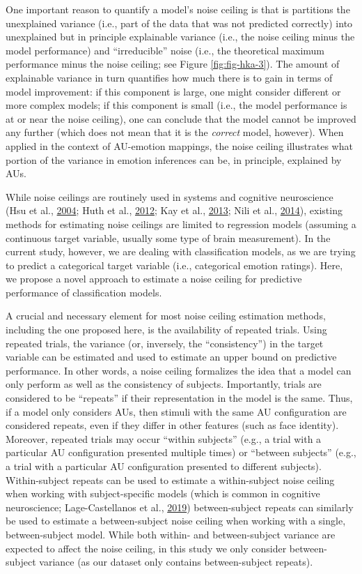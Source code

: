 \documentclass[11pt,american,a4paper,oneside,]{memoir} %
\begin{document}
One important reason to quantify a model's noise ceiling is that is partitions the unexplained variance (i.e., part of the data that was not predicted correctly) into unexplained but in principle explainable variance (i.e., the noise ceiling minus the model performance) and ``irreducible'' noise (i.e., the theoretical maximum performance minus the noise ceiling; see Figure \ref{fig:fig-hka-3}). The amount of explainable variance in turn quantifies how much there is to gain in terms of model improvement: if this component is large, one might consider different or more complex models; if this component is small (i.e., the model performance is at or near the noise ceiling), one can conclude that the model cannot be improved any further (which does not mean that it is the \emph{correct} model, however). When applied in the context of AU-emotion mappings, the noise ceiling illustrates what portion of the variance in emotion inferences can be, in principle, explained by AUs.

While noise ceilings are routinely used in systems and cognitive neuroscience (Hsu et al., \protect\hyperlink{ref-Hsu2004-hs}{2004}; Huth et al., \protect\hyperlink{ref-Huth2012-yc}{2012}; Kay et al., \protect\hyperlink{ref-Kay2013-ch}{2013}; Nili et al., \protect\hyperlink{ref-Nili2014-ar}{2014}), existing methods for estimating noise ceilings are limited to regression models (assuming a continuous target variable, usually some type of brain measurement). In the current study, however, we are dealing with classification models, as we are trying to predict a categorical target variable (i.e., categorical emotion ratings). Here, we propose a novel approach to estimate a noise ceiling for predictive performance of classification models.

A crucial and necessary element for most noise ceiling estimation methods, including the one proposed here, is the availability of repeated trials. Using repeated trials, the variance (or, inversely, the ``consistency'') in the target variable can be estimated and used to estimate an upper bound on predictive performance. In other words, a noise ceiling formalizes the idea that a model can only perform as well as the consistency of subjects. Importantly, trials are considered to be ``repeats'' if their representation in the model is the same. Thus, if a model only considers AUs, then stimuli with the same AU configuration are considered repeats, even if they differ in other features (such as face identity). Moreover, repeated trials may occur ``within subjects'' (e.g., a trial with a particular AU configuration presented multiple times) or ``between subjects'' (e.g., a trial with a particular AU configuration presented to different subjects). Within-subject repeats can be used to estimate a within-subject noise ceiling when working with subject-specific models (which is common in cognitive neuroscience; Lage-Castellanos et al., \protect\hyperlink{ref-lage2019methods}{2019}) between-subject repeats can similarly be used to estimate a between-subject noise ceiling when working with a single, between-subject model. While both within- and between-subject variance are expected to affect the noise ceiling, in this study we only consider between-subject variance (as our dataset only contains between-subject repeats).
\end{document}
